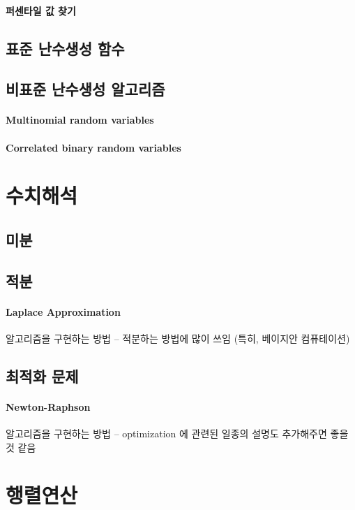 \documentclass{report}
\begin{document}
\paragraph{퍼센타일 값 찾기}

\subsection{표준 난수생성 함수}

\subsection{비표준 난수생성 알고리즘}
\paragraph{Multinomial random variables}

\paragraph{Correlated binary random variables}

\section{수치해석}

\subsection{미분}

\subsection{적분}
\paragraph{Laplace Approximation} 알고리즘을 구현하는 방법 -- 적분하는 방법에 많이 쓰임 (특히, 베이지안 컴퓨테이션) 

\subsection{최적화 문제}
\paragraph{Newton-Raphson} 알고리즘을 구현하는 방법 -- optimization 에 관련된 일종의 설명도 추가해주면 좋을 것 같음 


\section{행렬연산}
\end{document}
